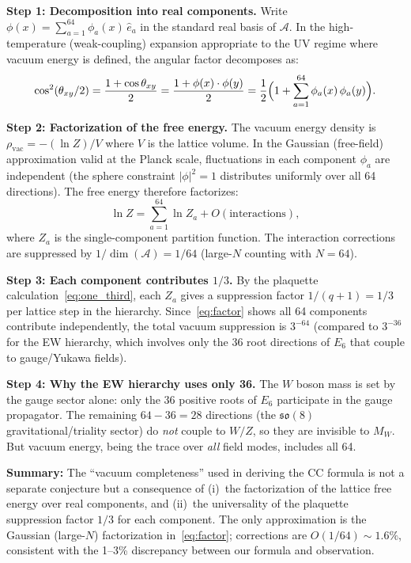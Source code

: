 \documentclass[12pt,a4paper]{article}
\theoremstyle{definition}
\theoremstyle{remark}
\newcommand{\Alg}{\mathcal{A}}
\begin{document}
\textbf{Step 1: Decomposition into real components.}  
Write $\phi(x) = \sum_{a=1}^{64} \phi_a(x)\, \hat{e}_a$ in the standard 
real basis of $\Alg$. In the high-temperature (weak-coupling) expansion 
appropriate to the UV regime where vacuum energy is defined, the angular 
factor decomposes as:
\begin{equation}
\cos^2(\theta_{xy}/2) = \frac{1 + \cos\theta_{xy}}{2} 
= \frac{1 + \phi(x)\cdot\phi(y)}{2} 
= \frac{1}{2}\Bigl(1 + \sum_{a=1}^{64} \phi_a(x)\,\phi_a(y)\Bigr).
\label{eq:decomp}
\end{equation}

\textbf{Step 2: Factorization of the free energy.}  
The vacuum energy density is $\rho_{\mathrm{vac}} = -(\ln Z)/V$ where $V$ is 
the lattice volume. In the Gaussian (free-field) approximation valid at the 
Planck scale, fluctuations in each component $\phi_a$ are independent (the 
sphere constraint $|\phi|^2 = 1$ distributes uniformly over all 64 
directions). The free energy therefore factorizes:
\begin{equation}
\ln Z = \sum_{a=1}^{64} \ln Z_a + O(\text{interactions}),
\label{eq:factor}
\end{equation}
where $Z_a$ is the single-component partition function. The interaction 
corrections are suppressed by $1/\dim(\Alg) = 1/64$ (large-$N$ counting 
with $N = 64$).

\textbf{Step 3: Each component contributes $1/3$.}  
By the plaquette calculation~\eqref{eq:one_third}, each $Z_a$ gives a 
suppression factor $1/(q+1) = 1/3$ per lattice step in the hierarchy. 
Since~\eqref{eq:factor} shows all 64 components contribute independently, 
the total vacuum suppression is $3^{-64}$ (compared to $3^{-36}$ for 
the EW hierarchy, which involves only the 36 root directions of $E_6$ 
that couple to gauge/Yukawa fields).

\textbf{Step 4: Why the EW hierarchy uses only 36.}  
The $W$ boson mass is set by the gauge sector alone: only the 36 positive 
roots of $E_6$ participate in the gauge propagator. The remaining $64 - 36 = 28$ 
directions (the $\mathfrak{so}(8)$ gravitational/triality sector) do 
\emph{not} couple to $W/Z$, so they are invisible to $M_W$. But vacuum 
energy, being the trace over \emph{all} field modes, includes all 64.

\medskip
\noindent\textbf{Summary:} The ``vacuum completeness'' used in deriving the 
CC formula is not a separate conjecture but a consequence of (i)~the 
factorization of the lattice free energy over real components, and (ii)~the 
universality of the plaquette suppression factor $1/3$ for each component. 
The only approximation is the Gaussian (large-$N$) factorization 
in~\eqref{eq:factor}; corrections are $O(1/64) \sim 1.6\%$, consistent with 
the 1--3\% discrepancy between our formula and observation.
\end{document}
